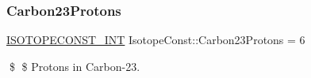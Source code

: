 \subsubsection{\texorpdfstring{Carbon23\+Protons}{Carbon23Protons}}
{\footnotesize\ttfamily \mbox{\hyperlink{group___isotope_const-_macros_ga5f18360b3e99483a35c32d789e62621c}{I\+S\+O\+T\+O\+P\+E\+C\+O\+N\+S\+T\+\_\+\+I\+NT}} Isotope\+Const\+::\+Carbon23\+Protons = 6}

\$ \$ Protons in Carbon-\/23. 
